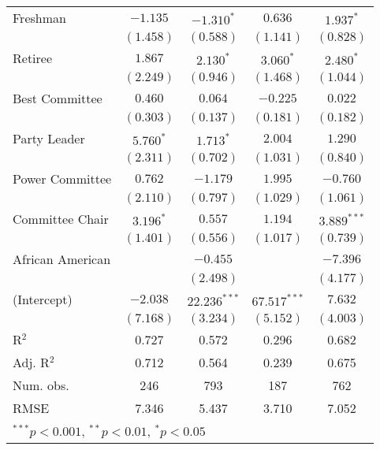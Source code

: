 \documentclass[12pt]{article}
\begin{document}
\begin{table}[!ht]
\begin{center}
\begin{tabular}{l c c c c }
			Freshman               & $-1.135$       & $-1.310^{*}$   & $0.636$        & $1.937^{*}$    \\
			& $(1.458)$      & $(0.588)$      & $(1.141)$      & $(0.828)$      \\
			Retiree                & $1.867$        & $2.130^{*}$    & $3.060^{*}$    & $2.480^{*}$    \\
			& $(2.249)$      & $(0.946)$      & $(1.468)$      & $(1.044)$      \\
			Best Committee        & $0.460$        & $0.064$        & $-0.225$       & $0.022$        \\
			& $(0.303)$      & $(0.137)$      & $(0.181)$      & $(0.182)$      \\
			Party Leader                 & $5.760^{*}$    & $1.713^{*}$    & $2.004$        & $1.290$        \\
			& $(2.311)$      & $(0.702)$      & $(1.031)$      & $(0.840)$      \\
			Power Committee       & $0.762$        & $-1.179$       & $1.995$        & $-0.760$       \\
			& $(2.110)$      & $(0.797)$      & $(1.029)$      & $(1.061)$      \\
			Committee Chair                  & $3.196^{*}$    & $0.557$        & $1.194$        & $3.889^{***}$  \\
			& $(1.401)$      & $(0.556)$      & $(1.017)$      & $(0.739)$      \\
			African American                   &                & $-0.455$       &                & $-7.396$       \\
			&                & $(2.498)$      &                & $(4.177)$      \\
			(Intercept)            & $-2.038$       & $22.236^{***}$ & $67.517^{***}$ & $7.632$        \\
			& $(7.168)$      & $(3.234)$      & $(5.152)$      & $(4.003)$      \\
			\hline
			R$^2$                  & 0.727          & 0.572          & 0.296          & 0.682          \\
			Adj. R$^2$             & 0.712          & 0.564          & 0.239          & 0.675          \\
			Num. obs.              & 246            & 793            & 187            & 762            \\
			RMSE                   & 7.346          & 5.437          & 3.710          & 7.052          \\
			\hline
			\multicolumn{5}{l}{\scriptsize{$^{***}p<0.001$, $^{**}p<0.01$, $^*p<0.05$}}
		\end{tabular}
	\end{center}
\end{table}
\end{document}
